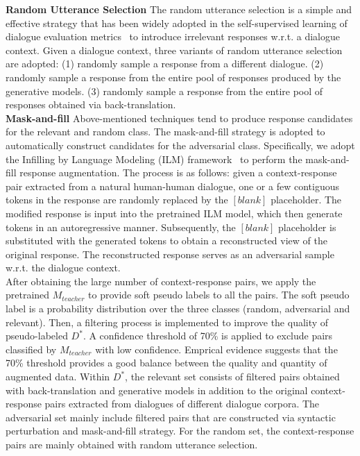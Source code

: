 \documentclass[letterpaper]{article} \usepackage{aaai22}  \usepackage{times}  \usepackage{helvet}  \usepackage{courier}  \usepackage[hyphens]{url}  \usepackage{graphicx} \urlstyle{rm} \def\UrlFont{\rm}  \usepackage{natbib}  \usepackage{caption} \DeclareCaptionStyle{ruled}{labelfont=normalfont,labelsep=colon,strut=off} \frenchspacing  \setlength{\pdfpagewidth}{8.5in}  \setlength{\pdfpageheight}{11in}  \usepackage{algorithm}
\begin{document}
\noindent\textbf{Random Utterance Selection}
The random utterance selection is a simple and effective strategy that has been widely adopted in the self-supervised learning of dialogue evaluation metrics~\citep{mehri-eskenazi-2020-usr,huang-etal-2020-grade,sai-etal-2020-improving} to introduce irrelevant responses w.r.t. a dialogue context. Given a dialogue context, three variants of random utterance selection are adopted: (1) randomly sample a response from a different dialogue. (2) randomly sample a response from the entire pool of responses produced by the generative models. (3) randomly sample a response from the entire pool of responses obtained via back-translation.
\\

\noindent\textbf{Mask-and-fill}
Above-mentioned techniques tend to produce response candidates for the relevant and random class. The mask-and-fill strategy is adopted to automatically construct candidates for the adversarial class. Specifically, we adopt the Infilling by Language Modeling (ILM) framework~\citep{donahue-etal-2020-enabling} to perform the mask-and-fill response augmentation. The process is as follows: given a context-response pair extracted from a natural human-human dialogue, one or a few contiguous tokens in the response are randomly replaced by the $[blank]$ placeholder. The modified response is input into the pretrained ILM model, which then generate tokens in an autoregressive manner. Subsequently, the $[blank]$ placeholder is substituted with the generated tokens to obtain a reconstructed view of the original response. The reconstructed response serves as an adversarial sample w.r.t. the dialogue context.
\\

\noindent
After obtaining the large number of context-response pairs, we apply the pretrained $M_{teacher}$ to provide soft pseudo labels to all the pairs. The soft pseudo label is a probability distribution over the three classes (random, adversarial and relevant). Then, a filtering process is implemented to improve the quality of pseudo-labeled $D^{\text{*}}$. A confidence threshold of 70\% is applied to exclude pairs classified by $M_{teacher}$ with low confidence. Emprical evidence suggests that the 70\% threshold provides a good balance between the quality and quantity of augmented data. Within $D^{\text{*}}$, the relevant set consists of filtered pairs obtained with back-translation and generative models in addition to the original context-response pairs extracted from dialogues of different dialogue corpora. The adversarial set mainly include filtered pairs that are constructed via syntactic perturbation and mask-and-fill strategy. For the random set, the context-response pairs are mainly obtained with random utterance selection. 
\end{document}
